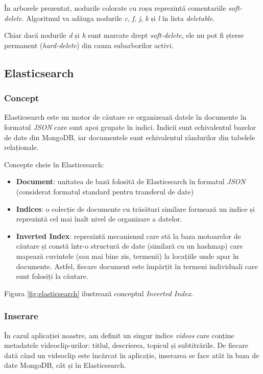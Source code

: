 \vspace{2em}

\par
În arborele prezentat, nodurile colorate cu roșu reprezintă comentariile \textit{soft-delete}. Algoritmul
va adăuga nodurile \textit{c}, \textit{f}, \textit{j}, \textit{k} și \textit{l} în lista \textit{deletable}.
\par
Chiar dacă nodurile \textit{d} și \textit{h} sunt marcate drept \textit{soft-delete}, ele nu pot fi șterse
permanent (\textit{hard-delete}) din cauza subarborilor activi.

\subsection{Elasticsearch}
\subsubsection{Concept}
Elasticsearch este un motor de căutare ce organizează datele în documente în formatul \textit{JSON} care
sunt apoi grupate în indici. Indicii sunt echivalentul bazelor de date din MongoDB, iar documentele sunt
echivalentul rândurilor din tabelele relaționale.

\par
Concepte cheie în Elasticsearch:
\begin{itemize}
    \item \textbf{Document}: unitatea de bază folosită de Elasticsearch în formatul \textit{JSON}
    (considerat formatul standard pentru transferul de date)
    \item \textbf{Indices}: o colecție de documente cu trăsături similare formează un indice și reprezintă
    cel mai înalt nivel de organizare a datelor.
    \item \textbf{Inverted Index}: reprezintă mecanismul care stă la baza motoarelor de căutare și constă
    într-o structură de date (similară cu un hashmap) care mapează cuvintele (sau mai bine zis, termenii)
    la locațiile unde apar în documente. Astfel, fiecare document este împărțit în termeni individuali 
    care sunt folosiți la căutare.
\end{itemize}

\par
Figura \ref{fig:elasticsearch} ilustrează conceptul \textit{Inverted Index}. \cite{elasticsearchexplained}

\subsubsection{Inserare}
\par
În cazul aplicației noastre, am definit un singur indice \textit{videos} care conține metadatele
videoclip-urilor: titlul, descrierea, topicul și subtitrările. De fiecare dată când un videoclip
este încărcat în aplicație, inserarea se face atât în baza de date MongoDB, cât și în Elasticsearch.


